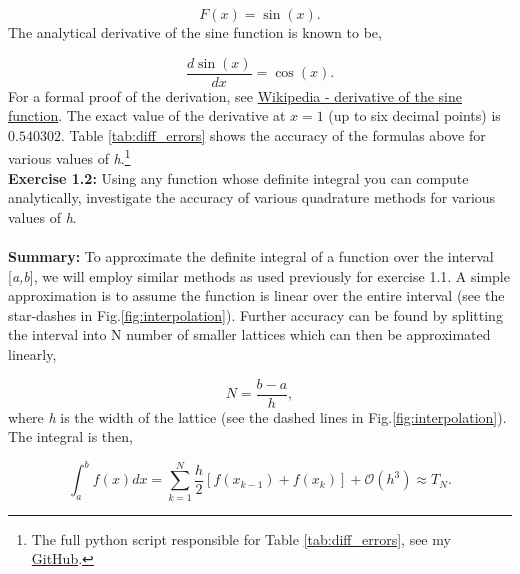 \documentclass[10pt]{article}
\begin{document}
\[
	F(x) = \sin(x).
\]
The analytical derivative of the sine function is known to be,

\[
	\frac{d \sin(x)}{dx} = \cos(x).
\]
For a formal proof of the derivation, see \href{https://en.wikipedia.org/wiki/Differentiation_of_trigonometric_functions#Derivative_of_the_sine_function}{Wikipedia - derivative of the sine function}. The exact value of the derivative at $x=1$ (up to six decimal points) is $0.540302$. Table \ref{tab:diff_errors} shows the accuracy of the formulas above for various values of \textit{h}.\footnote{The full python script responsible for Table \ref{tab:diff_errors}, see my \href{https://github.com/jmelahman/computational-physics-solutions/blob/master/exercises_python/Chapter\%201/exercise1_1.py}{GitHub}.} \\

\newpage\noindent\label{exercise:1.2}\textbf{Exercise 1.2:} Using any function whose definite integral you can compute analytically, investigate the accuracy of various quadrature methods for various values of \textit{h}. \\
\\
\label{summary:1.2}\textbf{Summary:}
To approximate the definite integral of a function over the interval [\textit{a,b}], we will employ similar methods as used previously for exercise 1.1. A simple approximation is to assume the function is linear over the entire interval (see the star-dashes in Fig.\ref{fig:interpolation}). Further accuracy can be found by splitting the interval into N number of smaller lattices which can then be approximated linearly,

\[
	N = \frac{b-a}{h},
\]
where \textit{h} is the width of the lattice (see the dashed lines in Fig.\ref{fig:interpolation}). The integral is then,

\begin{equation}
	\label{eq:trapezoidal}
	\int^b_a f(x)dx = \sum^N_{k=1} \frac{h}{2}[f(x_{k-1})+f(x_k)] + \mathcal{O}(h^3) \approx T_N.
\end{equation}
\end{document}
